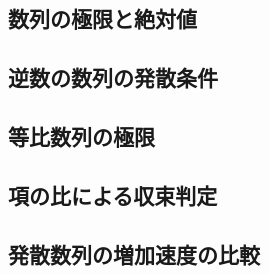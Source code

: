 \documentclass[../../math-imaging]{subfiles}
\begin{document}

\subsection{数列の極限と絶対値}


\subsection{逆数の数列の発散条件}


\subsection{等比数列の極限}


\subsection{項の比による収束判定}


\subsection{発散数列の増加速度の比較}

\end{document}
